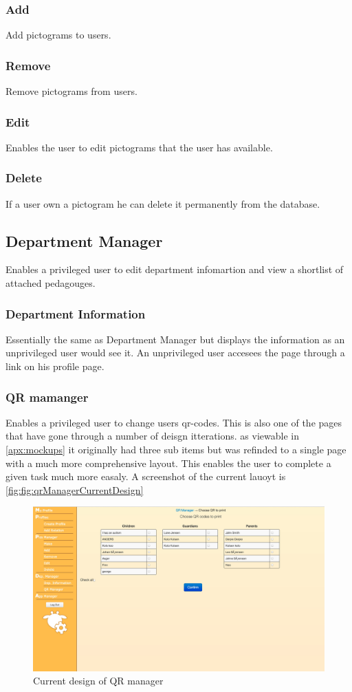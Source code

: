 \subsubsection*{Add}
Add pictograms to users.
\subsubsection*{Remove}
Remove pictograms from users.
\subsubsection*{Edit}
Enables the user to edit pictograms that the user has available.
\subsubsection*{Delete}
If a user own a pictogram he can delete it permanently from the database.

\subsection{Department Manager}
Enables a privileged user to edit department infomartion and view a shortlist of attached pedagouges.
\subsubsection*{Department Information}
Essentially the same as Department Manager but displays the information as an unprivileged user would see it. An unprivileged user accesees the page through a link on his profile page.
\subsubsection*{QR mamanger}
Enables a privileged user to change users qr-codes. This is also one of the pages that have gone through a number of deisgn itterations. as viewable in \ref{apx:mockups} it originally had three sub items but was refinded to a single page with a much more comprehensive layout. This enables the user to complete a given task much more easaly. A screenshot of the current lauoyt is \ref{fig:fig:qrManagerCurrentDesign}
\begin{figure}[p]
\centering
\includegraphics[width=1\textwidth]{images/mockup/qrManagerCurrent.jpg}
\caption{Current design of QR manager}
\label{fig:qrManagerCurrentDesign}
\end{figure}